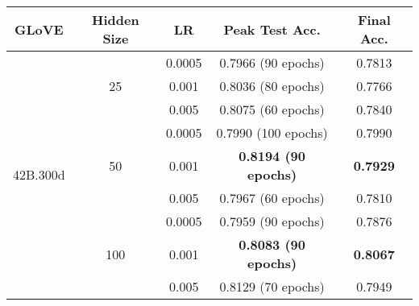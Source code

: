 \begin{table}[]
\begin{tabular}{@{}|c|c|c|c|c|@{}}
\toprule
\textbf{GLoVE}            & \textbf{Hidden Size} & \textbf{LR} & \textbf{Peak Test Acc.}     & \textbf{Final Acc.} \\ \midrule
\multirow{9}{*}{42B.300d} & \multirow{3}{*}{25}  & 0.0005      & 0.7966 (90 epochs)          & 0.7813              \\ \cmidrule(l){3-5} 
                          &                      & 0.001       & 0.8036 (80 epochs)          & 0.7766              \\ \cmidrule(l){3-5} 
                          &                      & 0.005       & 0.8075 (60 epochs)          & 0.7840              \\ \cmidrule(l){2-5} 
                          & \multirow{3}{*}{50}  & 0.0005      & 0.7990 (100 epochs)         & 0.7990              \\ \cmidrule(l){3-5} 
                          &                      & 0.001       & \textbf{0.8194 (90 epochs)} & \textbf{0.7929}     \\ \cmidrule(l){3-5} 
                          &                      & 0.005       & 0.7967 (60 epochs)          & 0.7810              \\ \cmidrule(l){2-5} 
                          & \multirow{3}{*}{100} & 0.0005      & 0.7959 (90 epochs)          & 0.7876              \\ \cmidrule(l){3-5} 
                          &                      & 0.001       & \textbf{0.8083 (90 epochs)} & \textbf{0.8067}     \\ \cmidrule(l){3-5} 
                          &                      & 0.005       & 0.8129 (70 epochs)          & 0.7949              \\ \bottomrule
\end{tabular}
\label{tab:my-table}
\end{table}